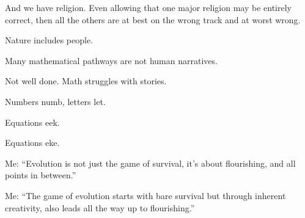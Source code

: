 And we have religion.  Even allowing
that one major religion may be entirely
correct, then all the others are at best
on the wrong track and at worst wrong.



Nature includes people.



Many mathematical pathways are not human narratives.

Not well done.  Math struggles with stories.

Numbers numb, letters let.

Equations eek.

Equations eke.





Me: ``Evolution is not just the game of survival, it's about flourishing,
and all points in between.''

Me: ``The game of evolution starts with bare survival but
through inherent creativity, also leads all the way up to flourishing.''
